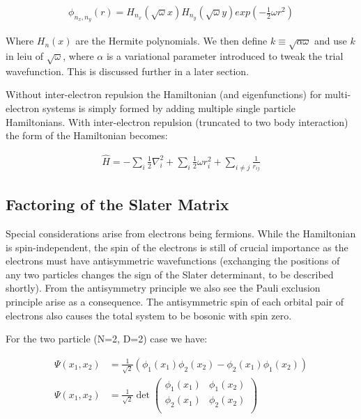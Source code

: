 \documentclass[11pt, conference, compsocconf]{IEEEtran}
\begin{document}
\begin{align}\phi_{n_x,n_y}\left(r\right) = H_{n_x}\left(\sqrt{\omega}x\right) H_{n_y}\left(\sqrt{\omega}y\right) exp\left(-\frac{1}{2}\omega r^2\right)\end{align}

Where $H_n\left(x\right)$ are the Hermite polynomials. We then define $k \equiv \sqrt{\alpha \omega}$ and use $k$ in leiu of $\sqrt{\omega}$, where $\alpha$ is a variational parameter introduced to tweak the trial wavefunction. This is discussed further in a later section.

Without inter-electron repulsion the Hamiltonian (and eigenfunctions) for multi-electron systems is simply formed by adding multiple single particle Hamiltonians. With inter-electron repulsion (truncated to two body interaction) the form of the Hamiltonian becomes:

\begin{align}\hat{H} = -\sum\limits_i {\frac{1}{2}\nabla_i^2} + \sum\limits_i {\frac{1}{2}\omega r_i^2} + \sum\limits_{i\neq j}\frac{1}{r_{ij}}\end{align}

\subsection{Factoring of the Slater Matrix}
Special considerations arise from electrons being fermions. While the Hamiltonian is spin-independent, the spin of the electrons is still of crucial importance as the electrons must have antisymmetric wavefunctions (exchanging the positions of any two particles changes the sign of the Slater determinant, to be described shortly). From the antisymmetry principle we also see the Pauli exclusion principle arise as a consequence. The antisymmetric spin of each orbital pair of electrons also causes the total system to be bosonic with spin zero.

For the two particle (N=2, D=2) case we have:

\begin{align}\Psi\left(x_1,x_2\right) &=\frac{1}{\sqrt{2}}\left(\phi_1\left(x_1\right)\phi_2\left(x_2\right) - \phi_2\left(x_1\right)\phi_1\left(x_2\right)\right)\\
\Psi\left(x_1,x_2\right) &=\frac{1}{\sqrt{2}}\det\left(\begin{array}{cc}
\phi_1\left(x_1\right) & \phi_1\left(x_2\right)\\
\phi_2\left(x_1\right) & \phi_2\left(x_2\right)\\
\end{array}\right)\end{align}
\end{document}
